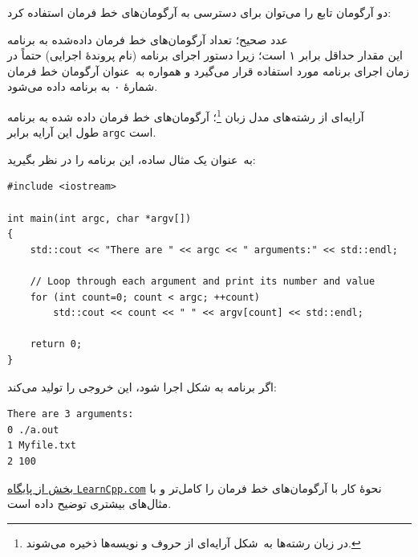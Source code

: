 \documentclass{utap}
\renewcommand{\labelitemi}{$\circ$}
\begin{document}
    دو آرگومان تابع
 را می‌توان برای دسترسی به آرگومان‌های خط فرمان استفاده کرد:
    \begin{description}[leftmargin=5em,style=nextline,font=\labelitemi\quad\bfseries]
        \item[\lr{\texttt{argc}}] عدد صحیح؛ تعداد آرگومان‌های خط فرمان داده‌شده به برنامه\\
        این مقدار حداقل برابر ۱ است؛ زیرا دستور اجرای برنامه (نام پروندهٔ اجرایی) حتماً در زمان اجرای برنامه مورد استفاده قرار می‌گیرد و همواره به~عنوان آرگومان خط فرمان شمارهٔ ۰ به برنامه داده می‌شود.
        \item[\lr{\texttt{argv}}] آرایه‌ای از رشته‌های مدل زبان \footnote{در زبان  رشته‌ها به~شکل آرایه‌ای از حروف و نویسه‌ها ذخیره می‌شوند.}؛ آرگومان‌های خط فرمان داده شده به برنامه\\
        طول این آرایه برابر \lstinline{argc} است.
    \end{description}

    به~عنوان یک مثال ساده، این برنامه را در نظر بگیرید:
    \begin{latin}\begin{lstlisting}
#include <iostream>
 
int main(int argc, char *argv[])
{
    std::cout << "There are " << argc << " arguments:" << std::endl;
 
    // Loop through each argument and print its number and value
    for (int count=0; count < argc; ++count)
        std::cout << count << " " << argv[count] << std::endl;
 
    return 0;
}

    \end{lstlisting}\end{latin}

    اگر برنامه به شکل  اجرا شود، این خروجی را تولید می‌کند:
    \begin{latin}%
    \begin{Verbatim}[fontsize=\small]
There are 3 arguments:
0 ./a.out
1 Myfile.txt
2 100
    \end{Verbatim}
    \end{latin}

    \href{https://www.learncpp.com/cpp-tutorial/713-command-line-arguments/}{بخش  از پایگاه \texttt{LearnCpp.com}} نحوهٔ کار با آرگومان‌های خط فرمان را کامل‌تر و با مثال‌های بیشتری توضیح داده است.
\end{document}
